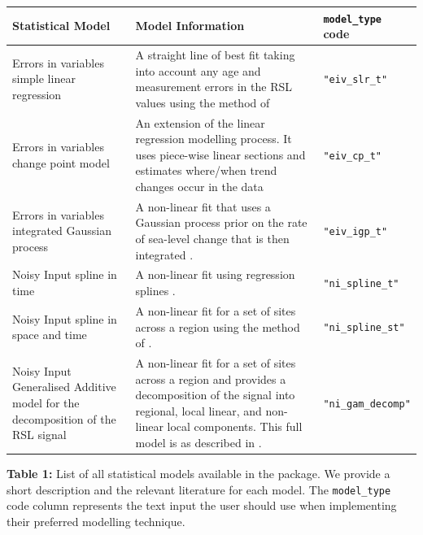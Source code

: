 \begin{longtable}[]{@{}
  >{\raggedright\arraybackslash}p{}
  >{\raggedright\arraybackslash}p{}
  >{\raggedright\arraybackslash}p{}@{}}
\toprule\noalign{}
\begin{minipage}[b]{\linewidth}\raggedright
\textbf{Statistical Model}
\end{minipage} & \begin{minipage}[b]{\linewidth}\raggedright
\textbf{Model Information}
\end{minipage} & \begin{minipage}[b]{\linewidth}\raggedright
\textbf{\texttt{model\_type} code}
\end{minipage} \\
\midrule\noalign{}
\endhead
\bottomrule\noalign{}
\endlastfoot
Errors in variables simple linear regression & A straight line of best fit taking into account any age and measurement errors in the RSL values using the method of \citet{Cahill2015aStats} & \texttt{"eiv\_slr\_t"} \\
Errors in variables change point model & An extension of the linear regression modelling process. It uses piece-wise linear sections and estimates where/when trend changes occur in the data \citep{Cahill2015aStats} & \texttt{"eiv\_cp\_t"} \\
Errors in variables integrated Gaussian process & A non-linear fit that uses a Gaussian process prior on the rate of sea-level change that is then integrated \citep{Cahill2015aStats}. & \texttt{"eiv\_igp\_t"} \\
Noisy Input spline in time & A non-linear fit using regression splines \citep{Upton2023noisy}. & \texttt{"ni\_spline\_t"} \\
Noisy Input spline in space and time & A non-linear fit for a set of sites across a region using the method of \citet{Upton2023noisy}. & \texttt{"ni\_spline\_st"} \\
Noisy Input Generalised Additive model for the decomposition of the RSL signal & A non-linear fit for a set of sites across a region and provides a decomposition of the signal into regional, local linear, and non-linear local components. This full model is as described in \citet{Upton2023noisy}. & \texttt{"ni\_gam\_decomp"} \\
\end{longtable}

\textbf{Table 1:} List of all statistical models available in the  package. We provide a short description and the relevant literature for each model. The \texttt{model\_type} code column represents the text input the user should use when implementing their preferred modelling technique.

